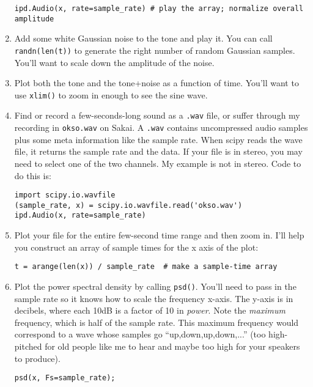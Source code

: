 \documentclass[11pt]{hmcpset}
\begin{document}
\begin{problem}
\begin{enumerate}
\begin{lstlisting}[style=Python]
ipd.Audio(x, rate=sample_rate) # play the array; normalize overall amplitude
\end{lstlisting}
\item Add some white Gaussian noise to the tone and play it. You can call \texttt{randn(len(t))} to generate the right number of random Gaussian samples. You'll want to scale down the amplitude of the noise.
\item Plot both the tone and the tone+noise as a function of time. You'll want to use \texttt{xlim()} to zoom in enough to see the sine wave.
\item Find or record a few-seconds-long sound as a \texttt{.wav} file, or suffer through my recording in \texttt{okso.wav} on Sakai. A \texttt{.wav} contains uncompressed audio samples plus some meta information like the sample rate. When scipy reads the wave file, it returns the sample rate and the data. If your file is in stereo, you may need to select one of the two channels. My example is not in stereo. Code to do this is:
\begin{lstlisting}[style=Python]
import scipy.io.wavfile
(sample_rate, x) = scipy.io.wavfile.read('okso.wav')
ipd.Audio(x, rate=sample_rate)
\end{lstlisting}
\vspace{-1em}
\item Plot your file for the entire few-second time range and then zoom in. I'll help you construct an array of sample times for the x axis of the plot:
\begin{lstlisting}[style=Python]
t = arange(len(x)) / sample_rate  # make a sample-time array
\end{lstlisting}
\vspace{-1em}
\item Plot the power spectral density by calling \texttt{psd()}. You'll need to pass in the sample rate so it knows how to scale the frequency x-axis. The y-axis is in decibels, where each 10dB is a factor of 10 in \textit{power}. Note the \textit{maximum} frequency, which is half of the sample rate. This maximum frequency would correspond to a wave whose samples go ``up,down,up,down,...'' (too high-pitched for old people like me to hear and maybe too high for your speakers to produce).
\begin{lstlisting}[style=Python]
psd(x, Fs=sample_rate);
\end{lstlisting}
	\end{enumerate}
\end{problem}
\end{document}

